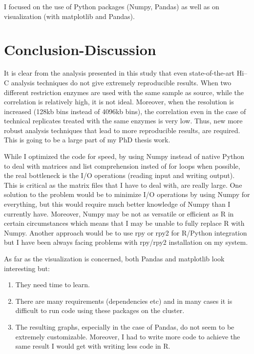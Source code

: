 \documentclass[a4paper, 11pt]{article} %
\begin{document}
I focused on the use of Python packages (Numpy, Pandas)
as well as on visualization (with matplotlib and Pandas). 





\section*{Conclusion-Discussion}

It is clear from the analysis presented in this study that
even state-of-the-art Hi--C analysis techniques do not
give extremely reproducible results. When two different
restriction enzymes are used with the same sample as source,
while the correlation is relatively high, it is not ideal.
Moreover, when the resolution is increased (128kb bins instead
of 4096kb bins), the correlation even in the case of technical
replicates treated with the same enzymes is very low. Thus, new
more robust analysis techniques that lead to more reproducible
results, are required. This is going to be a large part of my 
PhD thesis work.

While I optimized the code for speed, by using Numpy instead of
native Python to deal with matrices and list comprehension insted
of for loops when possible, the real bottleneck is the I/O operations
(reading input and writing output). This is critical as the matrix
files that I have to deal with, are really large. One solution to
the problem would be to minimize I/O operations by using Numpy
for everything, but this would require much better knowledge
of Numpy than I currently have. Moreover, Numpy may be not as versatile
or efficient as R in certain circumstances which means that 
I may be unable to fully replace R with Numpy. Another approach 
would be to use rpy or rpy2 for R/Python integration but I have been
always facing problems with rpy/rpy2 installation on my system.

As far as the visualization is concerned, both Pandas and matplotlib
look interesting but:

\begin{enumerate}
\item They need time to learn.  
\item There are many requirements (dependencies etc) and in many
cases it is difficult to run code using these packages on the cluster.
\item The resulting graphs, especially in the case of Pandas, do not
seem to be extremely customizable. Moreover, I had to write more
code to achieve the same result I would get with writing less
code in R.
\end{enumerate}
\end{document}
